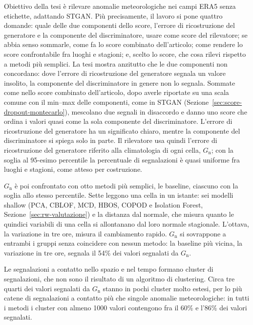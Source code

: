 Obiettivo della tesi è rilevare anomalie meteorologiche nei campi ERA5 senza etichette, adattando STGAN. Più precisamente, il lavoro si pone quattro domande: quale delle due componenti dello score, l'errore di ricostruzione del generatore e la componente del discriminatore, usare come score del rilevatore; se abbia senso sommarle, come fa lo score combinato dell'articolo; come rendere lo score confrontabile fra luoghi e stagioni; e, scelto lo score, che cosa rilevi rispetto a metodi più semplici. La tesi mostra anzitutto che le due componenti non concordano: dove l'errore di ricostruzione del generatore segnala un valore insolito, la componente del discriminatore in genere non lo segnala. Sommate come nello score combinato dell'articolo, dopo averle riportate su una scala comune con il min--max delle componenti, come in STGAN (Sezione~\ref{sec:score-dropout-montecarlo}), mescolano due segnali in disaccordo e danno uno score che ordina i valori quasi come la sola componente del discriminatore. L'errore di ricostruzione del generatore ha un significato chiaro, mentre la componente del discriminatore si spiega solo in parte. Il rilevatore usa quindi l'errore di ricostruzione del generatore riferito alla climatologia di ogni cella, $G_{\mathrm{n}}$; con la soglia al 95-esimo percentile la percentuale di segnalazioni è quasi uniforme fra luoghi e stagioni, come atteso per costruzione.

$G_{\mathrm{n}}$ è poi confrontato con otto metodi più semplici, le baseline, ciascuno con la soglia allo stesso percentile. Sette leggono una cella in un istante: sei modelli shallow (PCA, CBLOF, MCD, HBOS, COPOD e Isolation Forest, Sezione~\ref{sec:rw-valutazione}) e la distanza dal normale, che misura quanto le quindici variabili di una cella si allontanano dal loro normale stagionale. L'ottava, la variazione in tre ore, misura il cambiamento rapido. $G_{\mathrm{n}}$ si sovrappone a entrambi i gruppi senza coincidere con nessun metodo: la baseline più vicina, la variazione in tre ore, segnala il 54\% dei valori segnalati da $G_{\mathrm{n}}$.

Le segnalazioni a contatto nello spazio e nel tempo formano cluster di segnalazioni, che non sono il risultato di un algoritmo di clustering. Circa tre quarti dei valori segnalati da $G_{\mathrm{n}}$ stanno in pochi cluster molto estesi, per lo più catene di segnalazioni a contatto più che singole anomalie meteorologiche: in tutti i metodi i cluster con almeno 1000 valori contengono fra il 60\% e l'86\% dei valori segnalati.

